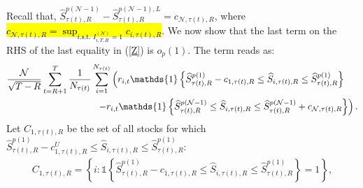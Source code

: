 Recall that, $\widehat{S}_{\tau(t),R}^{p(\mathcal{N}-1)}-\widehat{S}_{\tau(t),R}^{p(\mathcal{N}-1),L}=c_{\mathcal{N},\tau(t),R}$, where \hl{$c_{\mathcal{N},\tau(t),R}=\sup_{i\text{.s.t. }I_{i,T,R}^{(\mathcal{N})}=1}c_{i,\tau(t),R}$}. We now show that the last term on the RHS of the last equality in (\ref{Z}) is $o_{p}(1).$ The term reads as:
\begin{align*}
    &\frac{\mathcal{N}}{\sqrt{T-R}}\sum_{t=R+1}^{T}\frac{1}{N_{\tau(t)}}\sum_{i=1}^{N_{\tau(t)}}\left( r_{i,t}\mathds{1} \left\{ \widehat{S}_{\tau(t),R}^{p(1)}-c_{1,\tau(t),R} \leq \widehat{S}_{i,\tau(t),R}\leq \widehat{S}_{\tau(t),R}^{p(1)}\right\} \right. \notag \\
    &\hspace{3.4cm} \left. -r_{i,t}\mathds{1} \left\{ \widehat{S}_{\tau(t),R}^{p(\mathcal{N}-1)} \leq \widehat{S}_{i,\tau(t),R}\leq \widehat{S}_{\tau(t),R}^{p(\mathcal{N}-1)}+c_{\mathcal{N},\tau(t),R} \right\} \right). \label{BTNR}
\end{align*}
Let $C_{1,\tau(t),R}$ be the set of all stocks for which $\widehat{S}_{\tau(t),R}^{p(1)}-c_{1,\tau(t) ,R}^{U}\leq \widehat{S}_{i,\tau(t),R}\leq \widehat{S}_{\tau(t),R}^{p(1)}$:
\begin{align*}
    C_{1,\tau(t),R}=\left\{ i:\mathds{1} \left\{ \widehat{S}_{\tau(t),R}^{p(1)}-c_{1,\tau(t),R} \leq \widehat{S}_{i,\tau(t),R}\leq \widehat{S}_{\tau(t),R}^{p(1)}\right\} =1\right\} ,
\end{align*}

